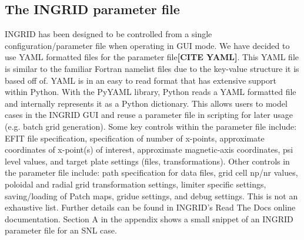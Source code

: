 \subsection{\label{sec:level2}The INGRID parameter file}
INGRID has been designed to be controlled from a single configuration/parameter file when operating in GUI mode. We have decided to use YAML formatted files for the parameter file\textbf{[CITE YAML]}. This YAML file is similar to the familiar Fortran namelist files due to the key-value structure it is based off of. YAML is in an easy to read format that has extensive support within Python. With the PyYAML library, Python reads a YAML formatted file and internally represents it as a Python dictionary. This allows users to model cases in the INGRID GUI and reuse a parameter file in scripting for later usage (e.g. batch grid generation). Some key controls within the parameter file include: EFIT file specification, specification of number of x-points, approximate coordinates of x-point(s) of interest, approximate magnetic-axis coordinates, psi level values, and target plate settings (files, transformations). Other controls in the parameter file include: path specification for data files, grid cell np/nr values, poloidal and radial grid transformation settings, limiter specific settings, saving/loading of Patch maps, gridue settings, and debug settings. This is not an exhaustive list. Further details can be found in INGRID's Read The Docs online documentation. Section A in the appendix shows a small snippet of an INGRID parameter file for an SNL case. 
